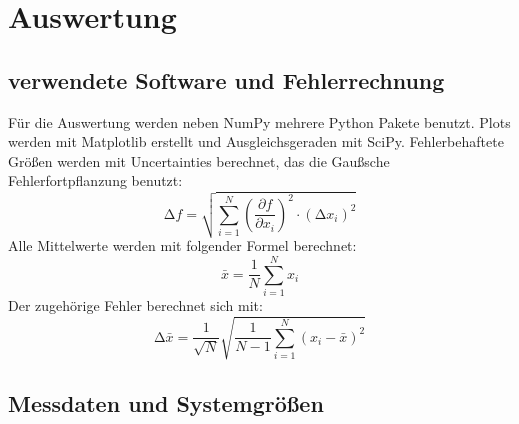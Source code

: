 \section{Auswertung}
\label{sec:Auswertung}

\subsection{verwendete Software und Fehlerrechnung}
\label{sec:SoftwareFehlerrechnung}

Für die Auswertung werden neben NumPy\cite{numpy} mehrere Python Pakete benutzt.
Plots werden mit Matplotlib\cite{matplotlib} erstellt und Ausgleichsgeraden mit SciPy\cite{scipy}.
Fehlerbehaftete Größen werden mit Uncertainties\cite{uncertainties} berechnet, das die Gaußsche Fehlerfortpflanzung benutzt:
\begin{equation*}
    \increment f = \sqrt{\sum_{i=1}^N \left( \frac{\partial f}{\partial x_i} \right)^{2} \cdot (\increment x_i)^{2}}
\end{equation*}
Alle Mittelwerte werden mit folgender Formel berechnet:
\begin{equation*}
  \bar{x} = \frac{1}{N} \sum_{i = 1}^N x_i
\end{equation*}
Der zugehörige Fehler berechnet sich mit:
\begin{equation*}
  \increment \bar{x} = \frac{1}{\sqrt{N}} \sqrt{\frac{1}{N-1} \sum_{i = 1}^N (x_i - \bar{x})^2}
\end{equation*}

\subsection{Messdaten und Systemgrößen}
\label{sec:Auswertung_Messdaten}

